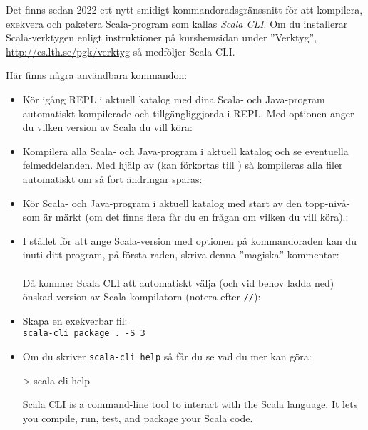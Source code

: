 Det finns sedan 2022 ett nytt smidigt kommandoradsgränssnitt  för att kompilera, exekvera och paketera Scala-program som kallas \emph{Scala CLI}. Om du installerar Scala-verktygen enligt instruktioner på kurshemsidan under ''Verktyg'', \url{http://cs.lth.se/pgk/verktyg} så medföljer Scala CLI. 

Här finns några användbara kommandon:
\begin{itemize}
\item Kör igång REPL i aktuell katalog med dina Scala- och Java-program automatiskt kompilerade och tillgängliggjorda i REPL. Med optionen  anger du vilken version av Scala du vill köra:\\

\item Kompilera alla Scala- och Java-program i aktuell katalog och se eventuella felmeddelanden. Med hjälp av  (kan förkortas till ) så kompileras alla filer automatiskt om så fort ändringar sparas:\\

\item Kör Scala- och Java-program i aktuell katalog med start av den topp-nivå- som är märkt  (om det finns flera får du en frågan om vilken  du vill köra).:\\

\item I stället för att ange Scala-version med optionen  på kommandoraden kan du inuti ditt program, på första raden, skriva denna ''magiska'' kommentar:\\ 
 \\
Då kommer Scala CLI att automatiskt välja (och vid behov ladda ned) önskad version av Scala-kompilatorn (notera \code{>} efter \texttt{//}):

\item Skapa en exekverbar fil:\\
\texttt{scala-cli package . -S 3}

\item Om du skriver \texttt{scala-cli help} så får du se vad du mer kan göra:

\begin{REPLsmall}
> scala-cli help

Scala CLI is a command-line tool to interact with the Scala language. It lets you compile, run, test, and 
package your Scala code.


\end{REPLsmall}
\end{itemize}
